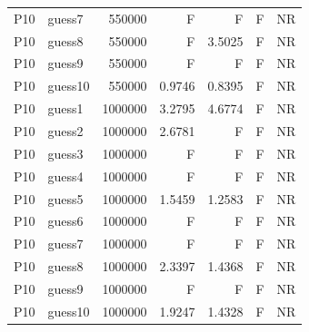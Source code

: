 {\begin{longtable}{llrrrrr}
P10 & guess7 & 550000 & F & F & F & NR \\
P10 & guess8 & 550000 & F & 3.5025 & F & NR \\
P10 & guess9 & 550000 & F & F & F & NR \\
P10 & guess10 & 550000 & 0.9746 & 0.8395 & F & NR \\
P10 & guess1 & 1000000 & 3.2795 & 4.6774 & F & NR \\
P10 & guess2 & 1000000 & 2.6781 & F & F & NR \\
P10 & guess3 & 1000000 & F & F & F & NR \\
P10 & guess4 & 1000000 & F & F & F & NR \\
P10 & guess5 & 1000000 & 1.5459 & 1.2583 & F & NR \\
P10 & guess6 & 1000000 & F & F & F & NR \\
P10 & guess7 & 1000000 & F & F & F & NR \\
P10 & guess8 & 1000000 & 2.3397 & 1.4368 & F & NR \\
P10 & guess9 & 1000000 & F & F & F & NR \\
P10 & guess10 & 1000000 & 1.9247 & 1.4328 & F & NR \\
\end{longtable}}

